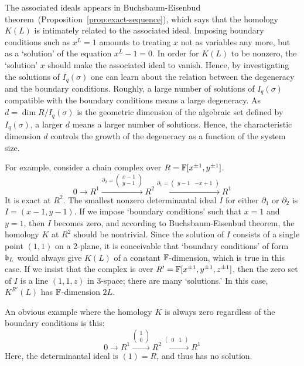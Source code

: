 The associated ideals appears in Buchsbaum-Eisenbud theorem~(Proposition~\ref{prop:exact-sequence}),
which says that the homology $K(L)$ is intimately related to the associated ideal.
Imposing boundary conditions such as $x^L=1$
amounts to treating $x$ not as variables any more,
but as a `solution' of the equation $x^L-1=0$.
In order for $K(L)$ to be nonzero,
the `solution' $x$ should make the associated ideal to vanish.
Hence, by investigating the solutions of $I_q(\sigma)$
one can learn about the relation between the degeneracy and the boundary conditions.
Roughly, a large number of solutions of $I_q(\sigma)$ 
compatible with the boundary conditions
means a large degeneracy.
As $d = \dim R/I_q(\sigma)$ is the geometric dimension of the algebraic set defined by $I_q(\sigma)$,
a larger $d$ means a larger number of solutions.
Hence, the characteristic dimension $d$
controls the growth of the degeneracy as a function of the system size.

For example, consider a chain complex over $R = \mathbb{F}[x^{\pm 1},y^{\pm 1}]$.
\[
0 \to
 R^1 
\xrightarrow{ \partial_2 = \begin{pmatrix} x-1 \\ y-1 \end{pmatrix} } 
 R^2
\xrightarrow{ \partial_1 = \begin{pmatrix} y-1 & -x +1 \end{pmatrix} }
 R^1
\]
It is exact at $R^2$.
The smallest nonzero determinantal ideal $I$ for either $\partial_1$ or $\partial_2$ is $I=(x-1,y-1)$.
If we impose `boundary conditions' such that $x=1$ and $y=1$,
then $I$ becomes zero, and according to Buchsbaum-Eisenbud theorem,
the homology $K$ at $R^2$ should be nontrivial.
Since the solution of $I$ consists of a single point $(1,1)$ on a 2-plane,
it is conceivable that `boundary conditions' of form $\mathfrak{b}_L$
would always give $K(L)$ of a constant $\mathbb{F}$-dimension,
which is true in this case.
%
If we insist that the complex is over $R' = \mathbb{F}[x^{\pm 1},y^{\pm 1},z^{\pm 1}]$,
then the zero set of $I$ is a line $(1,1,z)$ in 3-space;
there are many `solutions.'
In this case, $K^{R'}(L)$ has $\mathbb{F}$-dimension $2L$.

An obvious example where the homology $K$ is always zero regardless of the boundary conditions
is this:
\[
0 \to
 R^1 
\xrightarrow{ \begin{pmatrix} 1 \\ 0 \end{pmatrix} } 
 R^2
\xrightarrow{ \begin{pmatrix} 0 & 1 \end{pmatrix} }
 R^1
\]
Here, the determinantal ideal is $(1)=R$, and thus has no solution.

